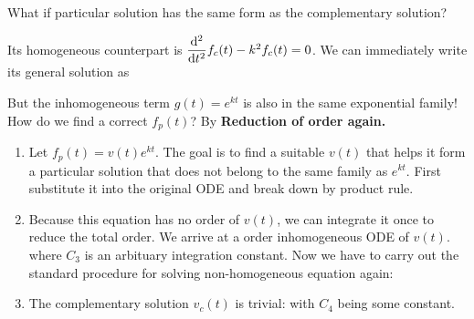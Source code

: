 \documentclass[class=article, crop=false, 12pt]{standalone}
\begin{document}
\begin{example}
    What if particular solution has the same form as the complementary solution?

    Its homogeneous counterpart is $\dvv[2]{t}f_c(t) - k^2f_c(t) = 0$. 
    We can immediately write its general solution as 

    But the inhomogeneous term $g(t) = e^{kt}$ is also in the same exponential family!
    How do we find a correct $f_p(t)$?
    By \bf{Reduction of order} again.
    
    \begin{enumerate}
        \item Let $f_p(t) = v(t)e^{kt}$.
        The goal is to find a suitable $v(t)$ that helps it form a particular solution that does not belong to the same family as $e^{kt}$. 
        First substitute it into the original ODE and break down by product rule.

        \item Because this equation has no  order of $v(t)$, 
        we can integrate it once to reduce the total order. 
        We arrive at a  order inhomogeneous ODE of $v(t)$.
        where $C_3$ is an arbituary integration constant. 
        Now we have to carry out the standard procedure for solving non-homogeneous equation again:

        \item The complementary solution $v_c(t)$ is trivial:
        with $C_4$ being some constant.


\end{enumerate}
\end{example}
\end{document}
